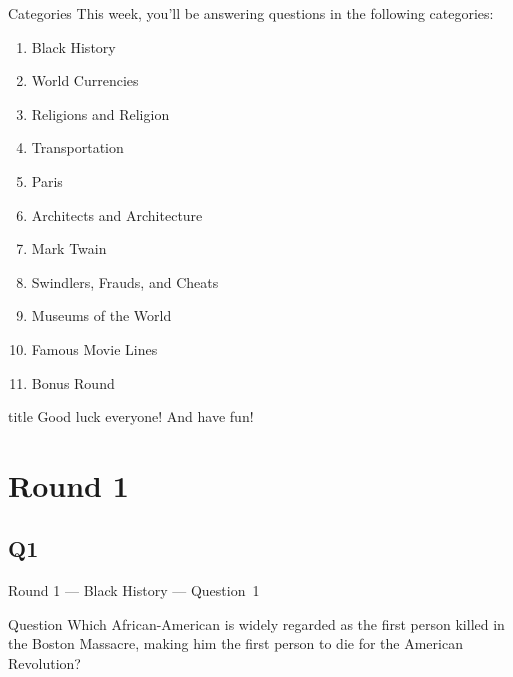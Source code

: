 \documentclass[11pt]{beamer}
\begin{document}
\begingroup{}
\begingroup{}
\begin{frame}[t]{Categories}
This week, you'll be answering questions in the following categories:
\begin{enumerate}
\item Black History
\item World Currencies
\item Religions and Religion
\item Transportation
\item Paris
\item Architects and Architecture
\item Mark Twain
\item Swindlers, Frauds, and Cheats
\item Museums of the World
\item Famous Movie Lines
\item Bonus Round
\end{enumerate}
\end{frame}
\endgroup{}

\begingroup{}
\begin{frame}
\vfill{}
\begin{beamercolorbox}[sep=8pt,center,shadow=true,rounded=true]{title}
Good luck everyone! And have fun!
\end{beamercolorbox}
\vfill{}
\end{frame}
\endgroup{}
\def\thisSectionName{Black History}
\section{Round 1}
\subsection*{Q1}
\begin{frame}[t]{Round 1 --- Black History --- \mbox{Question 1}}
\vspace{-0.5em}
\begin{block}{Question}
Which African-American is widely regarded as the first person killed in the Boston Massacre, making him the first person to die for the American Revolution?
\end{block}
\end{frame}
\end{document}
